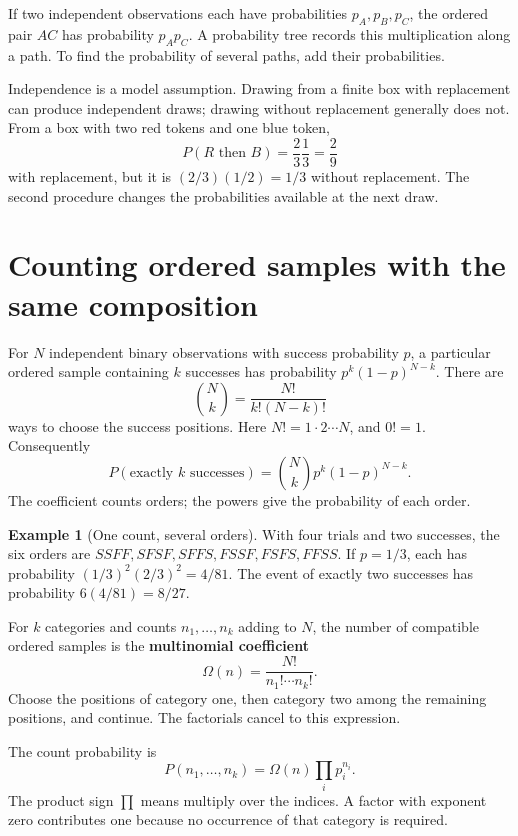 \documentclass[11pt,oneside,openany]{book}
\theoremstyle{definition}
\newtheorem{example}{Example}[chapter]
\theoremstyle{remark}
\numberwithin{equation}{chapter}
\begin{document}
If two independent observations each have probabilities \(p_A,p_B,p_C\), the ordered pair \(AC\) has probability \(p_Ap_C\). A probability tree records this multiplication along a path. To find the probability of several paths, add their probabilities.

Independence is a model assumption. Drawing from a finite box with replacement can produce independent draws; drawing without replacement generally does not. From a box with two red tokens and one blue token, \[P(R\text{ then }B)=\frac23\frac13=\frac29\] with replacement, but it is \((2/3)(1/2)=1/3\) without replacement. The second procedure changes the probabilities available at the next draw.

\section{Counting ordered samples with the same composition}\label{ch04-counting-ordered-samples-with-the-same-composition}

For \(N\) independent binary observations with success probability \(p\), a particular ordered sample containing \(k\) successes has probability \(p^k(1-p)^{N-k}\). There are \[\binom Nk=\frac{N!}{k!(N-k)!}\] ways to choose the success positions. Here \(N!=1\cdot2\cdots N\), and \(0!=1\). Consequently \[P(\text{exactly }k\text{ successes})=\binom Nk p^k(1-p)^{N-k}.\] The coefficient counts orders; the powers give the probability of each order.

\begin{example}[One count, several orders]

With four trials and two successes, the six orders are \(SSFF,SFSF,SFFS,FSSF,FSFS,FFSS\). If \(p=1/3\), each has probability \((1/3)^2(2/3)^2=4/81\). The event of exactly two successes has probability \(6(4/81)=8/27\).

\end{example}

For \(k\) categories and counts \(n_1,\ldots,n_k\) adding to \(N\), the number of compatible ordered samples is the \textbf{multinomial coefficient} \[\Omega(n)=\frac{N!}{n_1!\cdots n_k!}.\] Choose the positions of category one, then category two among the remaining positions, and continue. The factorials cancel to this expression.

The count probability is \[\boxed{P(n_1,\ldots,n_k)=\Omega(n)\prod_i p_i^{n_i}.}\] The product sign \(\prod\) means multiply over the indices. A factor with exponent zero contributes one because no occurrence of that category is required.
\end{document}
